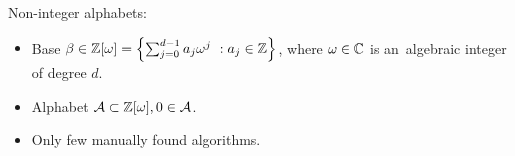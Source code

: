    
    Non-integer alphabets:
    \begin{itemize}
        \item Base $\beta \in \mathbb{Z}[\omega]= \left\{\sum_{j=0}^{d-1} a_j \omega^j\ : a_j \in \mathbb{Z} \right\}$, where $\omega \in \mathbb{C}$ is an~algebraic integer of degree $d$.
        
        \item Alphabet $\mathcal{A} \subset \mathbb{Z}[\omega] , 0\in \mathcal{A}$.
        
        \item Only few manually found algorithms. 
    \end{itemize}
    
     
